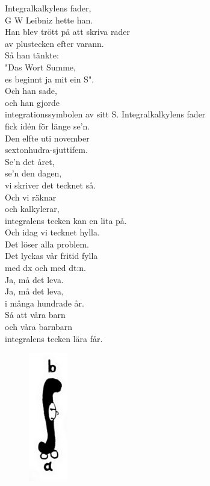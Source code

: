 \documentclass[a6paper, 10pt, twoside]{article}
\begin{document}
\begin{lyrics}
Integralkalkylens fader, \\
G W Leibniz hette han. \\
Han blev trött på att skriva rader \\
av plustecken efter varann. 
\vspace{5pt}\\
Så han tänkte: \\
"Das Wort Summe, \\
es beginnt ja mit ein S". \\
Och han sade, \\
och han gjorde \\
integrationssymbolen av sitt S. 
\newpage
\noindent
Integralkalkylens fader \\
fick idén för länge se'n. \\
Den elfte uti november \\
sextonhudra-sjuttifem. \\
Se'n det året, \\
se'n den dagen, \\
vi skriver det tecknet så. \\
Och vi räknar \\
och kalkylerar, \\
integralens tecken kan en lita på. 
\vspace{5pt} \\
Och idag vi tecknet hylla. \\
Det löser alla problem. \\
Det lyckas vår fritid fylla \\
med dx och med dt:n. \\
Ja, må det leva. \\
Ja, må det leva, \\
i många hundrade år. \\
Så att våra barn \\
och våra barnbarn \\
integralens tecken lära får. 
\end{lyrics}
\vspace{-10pt}
\begin{figure}[!h]
\hspace{30pt}\includegraphics[width=0.15\textwidth]{integral.jpg}
\end{figure}
\end{document}

